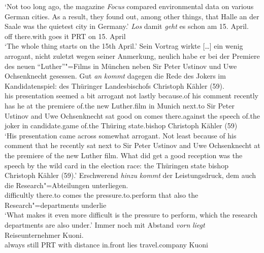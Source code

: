 \glt `Not too long ago, the magazine \emph{Focus} compared environmental data on various German cities. As a result, they found out, among other things, that Halle an der Saale was the quietest city in Germany.'
\ex\label{ex-los-damit} 
\gll \emph{Los} damit \emph{geht} es schon am 15. April.\footnotemark\\
	  off there.with goes it PRT on 15. April\\
\glt `The whole thing starts on the 15th April.'
\ex 
\gll Sein Vortrag wirkte [\ldots] ein wenig arrogant, nicht zuletzt wegen seiner Anmerkung, neulich habe er bei der Premiere des neuen "`Luther"'"=Films in München neben Sir Peter Ustinov und Uwe Ochsenknecht gesessen. Gut \emph{an} \emph{kommt} dagegen die Rede des Jokers im Kandidatenspiel: des Thüringer Landesbischofs Christoph Kähler (59).\footnotemark\\
    his presentation seemed {} a bit arrogant not lastly because.of his comment recently has he at the premiere of.the new Luther.film in Munich next.to Sir Peter Ustinov and Uwe Ochsenknecht sat good on comes there.against the speech of.the joker in candidate.game of.the Thüring state.bishop Christoph Kähler (59)\\
\glt `His presentation came across somewhat arrogant. Not least because of his comment that he recently sat next to Sir Peter Ustinov and Uwe Ochsenknecht at the premiere of the new Luther film. What did get a good reception was the speech by the wild card in the election race: the Thüringen state bishop Christoph Kähler (59).' 
\ex{}
\gll Erschwerend \emph{hinzu} \emph{kommt} der Leistungsdruck, dem auch die Research"=Abteilungen unterliegen.\label{ex-adv-non-true-particle}\\
	 difficultly there.to comes the pressure.to.perform that also the Research"=departments underlie\\
\glt `What makes it even more difficult is the pressure to perform, which the research departments are also under.'
\ex{}
\gll Immer  noch  mit  Abstand  \emph{vorn} \emph{liegt} Reiseunternehmer Kuoni.\footnotemark\\
	 always still PRT   with distance  in.front lies travel.company Kuoni\\
